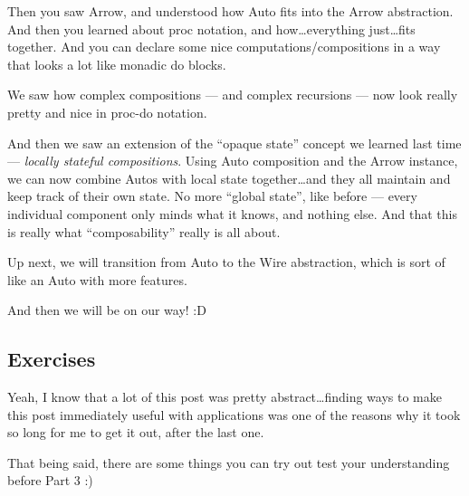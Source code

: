 \documentclass[]{article}
\begin{document}
Then you saw Arrow, and understood how Auto fits into the Arrow abstraction. And
then you learned about proc notation, and how\ldots everything just\ldots fits
together. And you can declare some nice computations/compositions in a way that
looks a lot like monadic do blocks.

We saw how complex compositions --- and complex recursions --- now look really
pretty and nice in proc-do notation.

And then we saw an extension of the ``opaque state'' concept we learned last
time --- \emph{locally stateful compositions}. Using Auto composition and the
Arrow instance, we can now combine Autos with local state together\ldots and
they all maintain and keep track of their own state. No more ``global state'',
like before --- every individual component only minds what it knows, and nothing
else. And that this is really what ``composability'' really is all about.

Up next, we will transition from Auto to the Wire abstraction, which is sort of
like an Auto with more features.

And then we will be on our way! :D

\subsection{Exercises}\label{exercises}

Yeah, I know that a lot of this post was pretty abstract\ldots finding ways to
make this post immediately useful with applications was one of the reasons why
it took so long for me to get it out, after the last one.

That being said, there are some things you can try out test your understanding
before Part 3 :)
\end{document}
